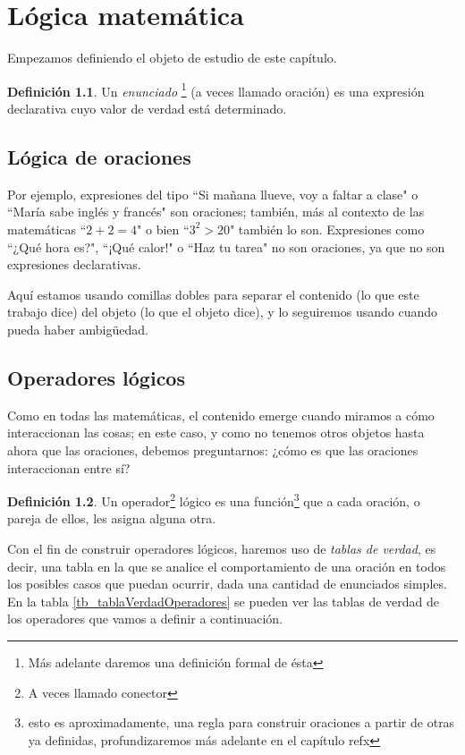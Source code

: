 \documentclass{book}
\theoremstyle{definition}
\newtheorem{df}{Definición}[chapter]
\begin{document}
\chapter{Lógica matemática}
Empezamos definiendo el objeto de estudio de este capítulo.
\begin{df}
	Un \emph{enunciado}
		\footnote{Más adelante daremos una definición formal de ésta} %
		(a veces llamado oración) es una expresión declarativa cuyo valor de verdad está determinado.
\end{df}

\section{Lógica de oraciones}
Por ejemplo, expresiones del tipo ``Si mañana llueve, voy a faltar a clase" o ``María sabe inglés y francés" son oraciones; también, más al contexto de las matemáticas ``$2+2=4$" o bien ``$3^2 > 20$" también lo son.
Expresiones como ``¿Qué hora es?", ``¡Qué calor!" o ``Haz tu tarea" no son oraciones, ya que no son expresiones declarativas.

Aquí estamos usando comillas dobles para separar el contenido (lo que este trabajo dice) del objeto (lo que el objeto dice), y lo seguiremos usando cuando pueda haber ambigüedad.

\section{Operadores lógicos}

Como en todas las matemáticas, el contenido emerge cuando miramos a cómo interaccionan las cosas; en este caso, y como no tenemos otros objetos hasta ahora que las oraciones, debemos preguntarnos: ¿cómo es que las oraciones interaccionan entre sí?

\begin{df}
	Un operador\footnote{A veces llamado conector} lógico es una función\footnote %
	{esto es aproximadamente, una regla para construir oraciones a partir de otras ya definidas, profundizaremos más adelante en el capítulo refx}
	que a cada oración, o pareja de ellos, les asigna alguna otra.
\end{df}

Con el fin de construir operadores lógicos, haremos uso de \emph{tablas de verdad}, es decir, una tabla en la que se analice el comportamiento de una oración en todos los posibles casos que puedan ocurrir, dada una cantidad de enunciados simples. En la tabla \ref{tb_tablaVerdadOperadores} se pueden ver las tablas de verdad de los operadores que vamos a definir a continuación.
\end{document}
